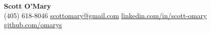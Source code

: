 \begin{center}
  {\LARGE\textbf{Scott O'Mary}}\\[3pt]
  (405) 618-8046 \textbar{}
  \href{mailto:scottomary@gmail.com}{scottomary@gmail.com} \textbar{}
  \href{https://www.linkedin.com/in/scott-omary}{linkedin.com/in/scott-omary} \textbar{}
  \href{https://github.com/omarys}{github.com/omarys}
\end{center}
\vspace{-5pt}
